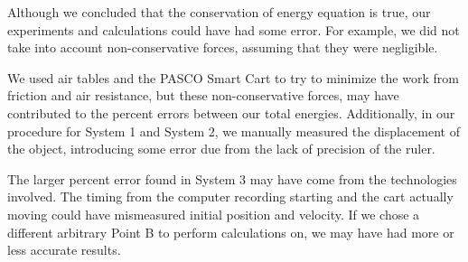 \documentclass[fleqn]{article}
\begin{document}
Although we concluded that the conservation of energy equation is true, our experiments and calculations could have had some error. For example, we did not take into account non-conservative forces, assuming that they were negligible.

We used air tables and the PASCO Smart Cart to try to minimize the work from friction and air resistance, but these non-conservative forces, may have contributed to the percent errors between our total energies. Additionally, in our procedure for System 1 and System 2, we manually measured the displacement of the object, introducing some error due from the lack of precision of the ruler.

The larger percent error found in System 3 may have come from the technologies involved. The timing from the computer recording starting and the cart actually moving could have mismeasured initial position and velocity. If we chose a different arbitrary Point B to perform calculations on, we may have had more or less accurate results.
\end{document}
